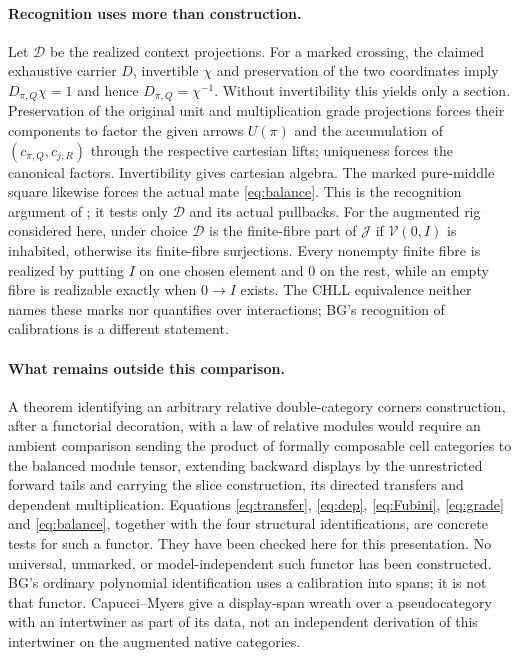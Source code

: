 \documentclass[11pt]{article}
\theoremstyle{definition}
\newcommand{\V}{\mathcal V}
\newcommand{\J}{\mathcal J}
\begin{document}
\paragraph{Recognition uses more than construction.}
Let $\mathcal D$ be the realized context projections. For a marked
crossing, the claimed exhaustive carrier $D$, invertible $\chi$ and
preservation of the two coordinates imply $D_{\pi,Q}\chi=1$ and
hence $D_{\pi,Q}=\chi^{-1}$. Without invertibility this yields only a
section. Preservation of the original unit and multiplication grade
projections forces their components to factor the given arrows
$U(\pi)$ and the accumulation of $(c_{\pi,Q},c_{j,R})$ through the
respective cartesian lifts; uniqueness forces the canonical factors.
Invertibility gives cartesian algebra. The marked pure-middle square
likewise forces the actual mate \eqref{eq:balance}. This is the
recognition argument of \cite[marked recognition]{O1}; it tests only
$\mathcal D$ and its actual pullbacks. For the augmented rig considered here, under choice $\mathcal D$ is
the finite-fibre part of $\J$ if $\V(0,I)$ is inhabited, otherwise its
finite-fibre surjections. Every nonempty finite fibre is realized by
putting $I$ on one chosen element and $0$ on the rest, while an empty
fibre is realizable exactly when $0\to I$ exists.
The CHLL equivalence neither names these marks nor quantifies over
interactions; BG's recognition of calibrations \cite[Thm.~8.2]{BG}
is a different statement.

\paragraph{What remains outside this comparison.}
A theorem identifying an arbitrary relative double-category corners
construction, after a functorial decoration, with a law of relative
modules would require an ambient comparison sending the product of
formally composable cell categories to the balanced module tensor,
extending backward displays by the unrestricted forward tails and
carrying the slice construction, its directed transfers and dependent
multiplication. Equations \eqref{eq:transfer}, \eqref{eq:dep},
\eqref{eq:Fubini}, \eqref{eq:grade} and \eqref{eq:balance}, together
with the four structural identifications, are concrete tests for such
a functor. They have been checked here for this presentation. No
universal, unmarked, or model-independent such functor has been
constructed. BG's ordinary polynomial identification
\cite[Props.~10.2--10.3]{BG} uses a calibration into spans;
it is not that functor. Capucci--Myers \cite[Def.~D.9]{CM} give a
display-span wreath over a pseudocategory with an intertwiner as
part of its data, not an independent derivation of this intertwiner
on the augmented native categories.
\end{document}
